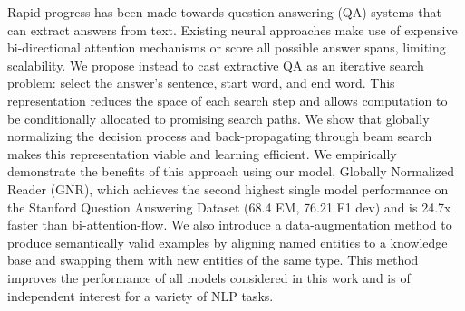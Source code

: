 Rapid progress has been made towards question answering (QA) systems that can extract answers from text. Existing neural approaches make use of expensive bi-directional attention mechanisms or score all possible answer spans, limiting scalability. We propose instead to cast extractive QA as an iterative search problem: select the answer's sentence, start word, and end word. This representation reduces the space of each search step and allows computation to be conditionally allocated to promising search paths. We show that globally normalizing the decision process and back-propagating through beam search makes this representation viable and learning efficient. We empirically demonstrate the benefits of this approach using our model, Globally Normalized Reader (GNR), which achieves the second highest single model performance on the Stanford Question Answering Dataset (68.4 EM, 76.21 F1 dev) and is 24.7x faster than bi-attention-flow. We also introduce a data-augmentation method to produce semantically valid examples by aligning named entities to a knowledge base and swapping them with new entities of the same type. This method  improves the performance of all models considered in this work and is of independent interest for a variety of NLP tasks.
